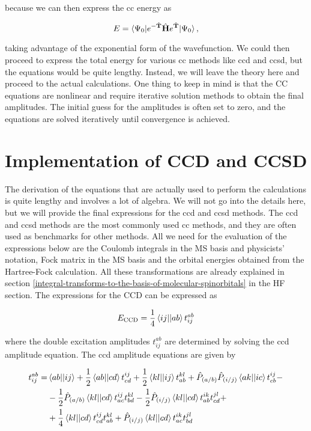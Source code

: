 \documentclass[open=any,parskip=half,11pt]{scrbook}
\begin{document}
because we can then express the \acrshort{cc} energy as

\begin{equation}
E=\braket{\Psi_0|e^{-\hat{\mathbf{T}}}\hat{\mathbf{H}}e^{\hat{\mathbf{T}}}|\Psi_0},
\end{equation}

taking advantage of the exponential form of the wavefunction. We could then proceed to express the total energy for various \acrshort{cc} methods like \acrshort{ccd} and \acrshort{ccsd}, but the equations would be quite lengthy. Instead, we will leave the theory here and proceed to the actual calculations. One thing to keep in mind is that the CC equations are nonlinear and require iterative solution methods to obtain the final amplitudes. The initial guess for the amplitudes is often set to zero, and the equations are solved iteratively until convergence is achieved.

\section{Implementation of CCD and CCSD}\label{implementation-of-ccd-and-ccsd}

The derivation of the equations that are actually used to perform the calculations is quite lengthy and involves a lot of algebra. We will not go into the details here, but we will provide the final expressions for the \acrshort{ccd} and \acrshort{ccsd} methods. The \acrshort{ccd} and \acrshort{ccsd} methods are the most commonly used \acrshort{cc} methods, and they are often used as benchmarks for other methods. All we need for the evaluation of the expressions below are the Coulomb integrals in the MS basis and physicists' notation, Fock matrix in the MS basis and the orbital energies obtained from the Hartree-Fock calculation. All these transformations are already explained in section \ref{integral-transforms-to-the-basis-of-molecular-spinorbitals} in the HF section. The expressions for the CCD can be expressed as

\begin{equation}
E_{\text{CCD}}=\frac{1}{4}\braket{ij||ab}t_{ij}^{ab}
\end{equation}

where the double excitation amplitudes \(t_{ij}^{ab}\) are determined by solving the \acrshort{ccd} amplitude equation. The \acrshort{ccd} amplitude equations are given by

\begin{align}
t_{ij}^{ab}=&\braket{ab||ij}+\frac{1}{2}\braket{ab||cd}t_{cd}^{ij}+\frac{1}{2}\braket{kl||ij}t_{ab}^{kl}+\hat{P}_{(a/b)}\hat{P}_{(i/j)}\braket{ak||ic}t_{cb}^{ij}- \\
&-\frac{1}{2}\hat{P}_{(a/b)}\braket{kl||cd}t_{ac}^{ij}t_{bd}^{kl}-\frac{1}{2}\hat{P}_{(i/j)}\braket{kl||cd}t_{ab}^{ik}t_{cd}^{jl}+ \\
&+\frac{1}{4}\braket{kl||cd}t_{cd}^{ij}t_{ab}^{kl}+\hat{P}_{(i/j)}\braket{kl||cd}t_{ac}^{ik}t_{bd}^{jl}
\end{align}
\end{document}
